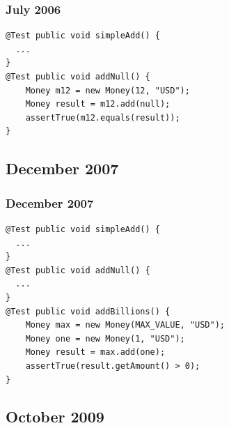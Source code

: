 \documentclass[14pt]{beamer}
\begin{document}
\begin{frame}[fragile]
\frametitle{July 2006}
\begin{center}
\begin{lstlisting}[frame=single]
@Test public void simpleAdd() {
  ...
}
@Test public void addNull() {
    Money m12 = new Money(12, "USD");
    Money result = m12.add(null);
    assertTrue(m12.equals(result));
}
\end{lstlisting} 
\end{center}
\end{frame}

\subsection{December 2007}


\begin{frame}[fragile]
\frametitle{December 2007}
\begin{center}
\begin{lstlisting}[frame=single]
@Test public void simpleAdd() {
  ...
}
@Test public void addNull() {
  ...
}
@Test public void addBillions() {
    Money max = new Money(MAX_VALUE, "USD");
    Money one = new Money(1, "USD");
    Money result = max.add(one);
    assertTrue(result.getAmount() > 0);
}
\end{lstlisting} 
\end{center}
\end{frame}

\subsection{October 2009}
\end{document}
